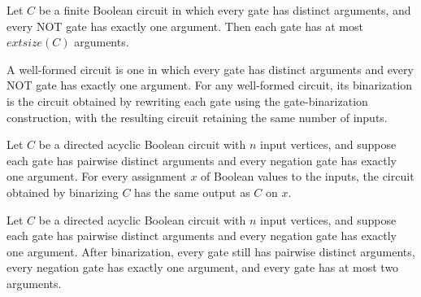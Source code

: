\begin{theorem}
\label{BoolCircuit.DAGCircuit.args_length_le_size}
\leanok
{}
Let $C$ be a finite Boolean circuit in which every gate has distinct arguments, and
every NOT gate has exactly one argument. Then each gate has at most $	ext{size}(C)$
arguments.
\end{theorem}

\begin{definition}
\label{BoolCircuit.DAGCircuit.binarize}
\leanok
{}
A well-formed circuit is one in which every gate has distinct arguments and every NOT
gate has exactly one argument. For any well-formed circuit, its binarization is the
circuit obtained by rewriting each gate using the gate-binarization construction, with
the resulting circuit retaining the same number of inputs.
\end{definition}

\begin{theorem}
\label{BoolCircuit.DAGCircuit.binarize_eval}
\leanok
{}
Let $C$ be a directed acyclic Boolean circuit with $n$ input vertices, and suppose each
gate has pairwise distinct arguments and every negation gate has exactly one argument.
For every assignment $x$ of Boolean values to the inputs, the circuit obtained by
binarizing $C$ has the same output as $C$ on $x$.
\end{theorem}

\begin{theorem}
\label{BoolCircuit.DAGCircuit.binarize_isFaninTwo}
\leanok
{}
Let $C$ be a directed acyclic Boolean circuit with $n$ input vertices, and suppose each
gate has pairwise distinct arguments and every negation gate has exactly one argument.
After binarization, every gate still has pairwise distinct arguments, every negation
gate has exactly one argument, and every gate has at most two arguments.
\end{theorem}

